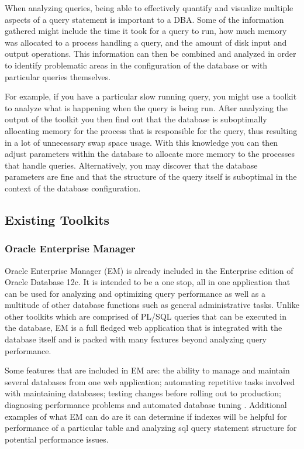 \documentclass[draftclsnofoot, onecolumn, compsoc, 10pt]{IEEEtran}
\begin{document}
When analyzing queries, being able to effectively quantify and visualize multiple aspects of a query statement is important to a DBA. 
Some of the information gathered might include the time it took for a query to run, how much memory was allocated to a process handling a query, and the amount of disk input and output operations. 
This information can then be combined and analyzed in order to identify problematic areas in the configuration of the database or with particular queries themselves. 

For example, if you have a particular slow running query, you might use a toolkit to analyze what is happening when the query is being run. 
After analyzing the output of the toolkit you then find out that the database is suboptimally allocating memory for the process that is responsible for the query, thus resulting in a lot of unnecessary swap space usage.
With this knowledge you can then adjust parameters within the database to allocate more memory to the processes that handle queries.
Alternatively, you may discover that the database parameters are fine and that the structure of the query itself is suboptimal in the context of the database configuration.

\subsection{Existing Toolkits}
\subsubsection{Oracle Enterprise Manager}
Oracle Enterprise Manager (EM) is already included in the Enterprise edition of Oracle Database 12c.
It is intended to be a one stop, all in one application that can be used for analyzing and optimizing query performance as well as a multitude of other database functions such as general administrative tasks. 
Unlike other toolkits which are comprised of PL/SQL queries that can be executed in the database, EM is a full fledged web application that is integrated with the database itself and is packed with many features beyond analyzing query performance. 

Some features that are included in EM are: the ability to manage and maintain several databases from one web application; automating repetitive tasks involved with maintaining databases; testing changes before rolling out to production; diagnosing performance problems and automated database tuning \cite{Manageability with Oracle Database 12c}. 
Additional examples of what EM can do are it can determine if indexes will be helpful for performance of a particular table and analyzing sql query statement structure for potential performance issues.
\end{document}
